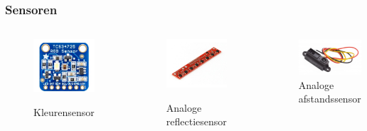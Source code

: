 \documentclass
   [kulak] %
   {kulakbeamer}
\begin{document}
\begin{frame}
	\frametitle{Sensoren}
	\begin{columns}
		\begin{figure}
			\centering
			\includegraphics[width=.7\textwidth]{kleurensensor}
			\caption{Kleurensensor}\cite{TCS34725KleurSensorBOB}
		\end{figure}
		\begin{figure}
			\centering
			\includegraphics[width=.8\textwidth]{reflectiesensor}
			\caption{Analoge reflectiesensor}\cite{QTR-8AAnalogeReflexieSensorArray}
		\end{figure}
		\begin{figure}
			\centering
			\includegraphics[width=.9\textwidth]{afstandssensor}
			\caption{Analoge afstandssensor}%
		\end{figure}
	\end{columns}
	
\end{frame}
\end{document}
